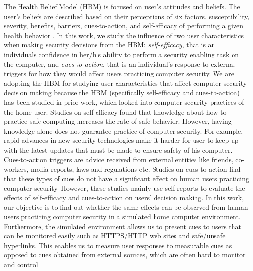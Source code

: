 The Health Belief Model (HBM) is focused on user's attitudes and beliefs. 
The user's beliefs are described based on their perceptions of six factors, susceptibility, severity, benefits, barriers, cues-to-action, and self-efficacy of performing a given health behavior \cite{rosenstock88}. 
In this work, we study the influence of two user characteristics when making security decisions from the HBM: \textit{self-efficacy}, that is an individuals confidence in her/his ability to perform a security enabling task on the computer, and \textit{cues-to-action}, that is an individual's response to external triggers for how they would affect users practicing computer security. 
We are adopting the HBM for studying user characteristics that affect computer security decision making because the HBM (specifically self-efficacy and cues-to-action) has been studied in prior work, which looked into computer security practices of the home user. 
Studies on self efficacy found that \cite{urbanska2013,aytes2004,milne2009} knowledge about how to practice safe computing increases the rate of safe behavior. 
However, having knowledge alone does not guarantee practice of computer security. 
For example, rapid advances in new security technologies make it harder for user to keep up with the latest updates that must be made to ensure safety of his computer. 
Cues-to-action triggers are advice received from external entities like friends, co-workers, media reports, laws and regulations etc. 
Studies on cues-to-action \cite{claar2010,ng2007} find that these types of cues do not have a significant effect on human users practicing computer security.  
However, these studies mainly use self-reports to evaluate the effects of self-efficacy and cues-to-action on users' decision making. 
In this work, our objective is to find out whether the same effects can be observed from human users practicing computer security in a simulated home computer environment. Furthermore, the simulated environment allows us to present cues to users that can be monitored easily such as HTTPS/HTTP web sites and safe/unsafe hyperlinks. 
This enables us to measure user responses to measurable cues as opposed to cues obtained from external sources, which are often hard to monitor and control.

